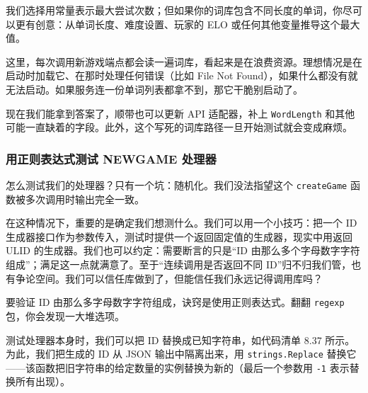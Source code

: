 我们选择用常量表示最大尝试次数；但如果你的词库包含不同长度的单词，你尽可以更有创意：从单词长度、难度设置、玩家的 ELO 或任何其他变量推导这个最大值。

这里，每次调用新游戏端点都会读一遍词库，看起来是在浪费资源。理想情况是在启动时加载它、在那时处理任何错误（比如 File Not Found），如果什么都没有就无法启动。如果服务连一份单词列表都拿不到，那它干脆别启动了。

现在我们能拿到答案了，顺带也可以更新 API 适配器，补上 \texttt{WordLength} 和其他可能一直缺着的字段。此外，这个写死的词库路径一旦开始测试就会变成麻烦。

\subsubsection*{用正则表达式测试 NEWGAME 处理器}

怎么测试我们的处理器？只有一个坑：随机化。我们没法指望这个 \texttt{createGame} 函数被多次调用时输出完全一致。

在这种情况下，重要的是确定我们想测什么。我们可以用一个小技巧：把一个 ID 生成器接口作为参数传入，测试时提供一个返回固定值的生成器，现实中用返回 ULID 的生成器。我们也可以约定：需要断言的只是``ID 由那么多个字母数字字符组成''；满足这一点就满意了。至于``连续调用是否返回不同 ID''归不归我们管，也有争论空间。我们可以信任库做到了，但能信任我们永远记得调用库吗？

要验证 ID 由那么多字母数字字符组成，诀窍是使用正则表达式。翻翻 \texttt{regexp} 包，你会发现一大堆选项。

测试处理器本身时，我们可以把 ID 替换成已知字符串，如代码清单 8.37 所示。为此，我们把生成的 ID 从 JSON 输出中隔离出来，用 \texttt{strings.Replace} 替换它——该函数把旧字符串的给定数量的实例替换为新的（最后一个参数用 \texttt{-1} 表示替换所有出现）。


